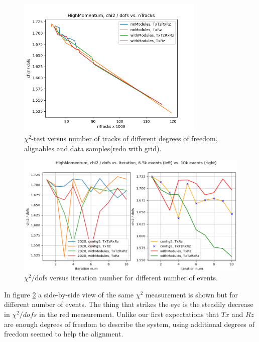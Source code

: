 \begin{figure}
  \centering
  \includegraphics[width=0.8\textwidth]{plots/nov_21/chi2_vs_ntracks_all.png}
  \caption{$\chi^2$-test versus number of tracks of different degrees of freedom, alignables and data samples(redo with grid).}
  \label{fig:chi2tracks}
\end{figure}

\begin{figure}
  \centering
  \includegraphics[width=\textwidth]{plots/renewed_plots/e5/4_17.png}
  \caption{$\chi^2 / \text{dofs}$ versus iteration number for different number of events.}
  \label{fig:chi2iterdec}
\end{figure}

In figure \ref{fig:chi2iterdec} a side-by-side view of the same $\chi^2$ measurement
is shown but for different number of events. The thing that strikes the eye is the steadily decrease in $\chi^2 / dofs$ in the red measurement. Unlike our first expectations that $Tx$ and $Rz$ are enough degrees of freedom to describe the system, using additional degrees of freedom seemed to help the alignment.

